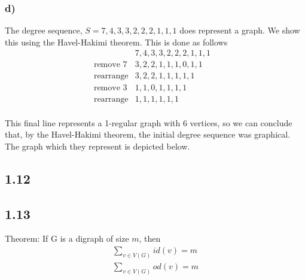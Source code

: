 \documentclass[a4paper]{article}
\begin{document}
\subsubsection*{d)}

The degree sequence, $S=7,4,3,3,2,2,2,1,1,1$ does represent a graph. We show this using the Havel-Hakimi theorem. This is done as follows
\begin{eqnarray*}
    &7,4,3,3,2,2,2,1,1,1&\\
    \text{remove 7} &3,2,2,1,1,1,0,1,1& \\ 
    \text{rearrange} &3,2,2,1,1,1,1,1& \\ 
    \text{remove 3} &1,1,0,1,1,1,1& \\
    \text{rearrange} &1,1,1,1,1,1& \\
\end{eqnarray*}

This final line represents a 1-regular graph with 6 vertices, so we can conclude that, by the Havel-Hakimi theorem, the initial degree sequence was graphical. The graph which they represent is depicted below.


\subsection*{1.12} 

\subsection*{1.13}

Theorem: If G is a digraph of size $m$, then
\begin{eqnarray} 
    \sum_{v \in V(G)} id(v) = m\\
    \sum_{v \in V(G)} od(v) = m\\
\end{eqnarray}
\end{document}
